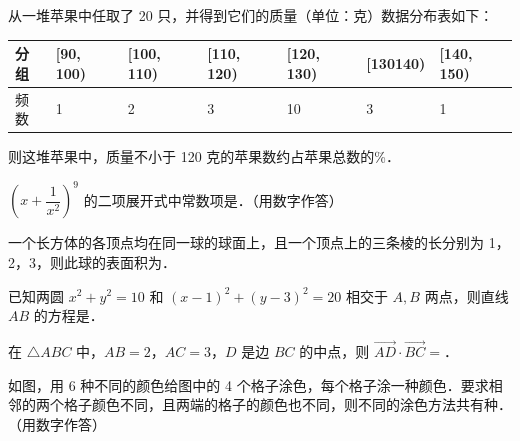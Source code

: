 \begin{question}
从一堆苹果中任取了 20 只，并得到它们的质量（单位：克）数据分布表如下：

\begin{center}
\begin{tabular}{lllllll}
\toprule
分组 & [90, 100) & [100, 110) & [110, 120) & [120, 130) & [130140) & [140, 150) \\
\midrule
频数 & 1 & 2 & 3 & 10 & 3 & 1 \\
\bottomrule
\end{tabular}
\end{center}

则这堆苹果中，质量不小于 120 克的苹果数约占苹果总数的\gkblank{}\%．

\end{question}
\begin{question}
$\left(x+\dfrac{1}{x^2}\right)^9$ 的二项展开式中常数项是\gkblank{}．（用数字作答）

\end{question}
\begin{question}
一个长方体的各顶点均在同一球的球面上，且一个顶点上的三条棱的长分别为 1，2，3，则此球的表面积为\gkblank{}．

\end{question}
\begin{question}
已知两圆 $x^2+y^2=10$ 和 $(x-1)^2+(y-3)^2=20$ 相交于 $A,B$ 两点，则直线 $AB$ 的方程是\gkblank{}．

\end{question}
\begin{question}
在 $\triangle ABC$ 中，$AB=2$，$AC=3$，$D$ 是边 $BC$ 的中点，则 $\overrightarrow{AD}\cdot\overrightarrow{BC}=$\gkblank{}．

\Needspace{0.4\textheight}
\end{question}
\begin{question}
如图，用 6 种不同的颜色给图中的 4 个格子涂色，每个格子涂一种颜色．要求相邻的两个格子颜色不同，且两端的格子的颜色也不同，则不同的涂色方法共有\gkblank{}种．（用数字作答）
\nopagebreak[4]
\begin{center}\end{center}
\nopagebreak[4]
\end{question}

